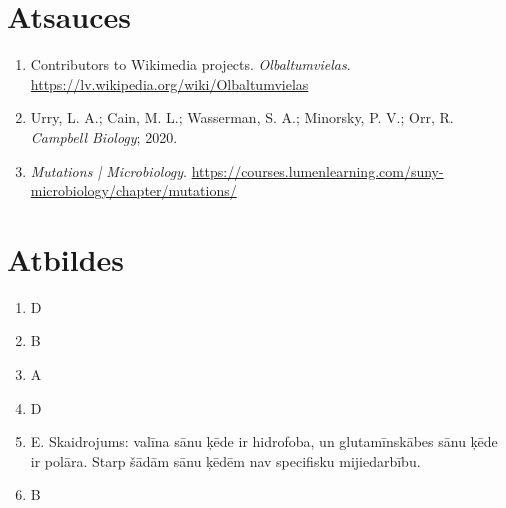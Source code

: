 \documentclass[12pt,a4paper]{article}
\begin{document}
\section*{Atsauces}
\begin{enumerate}[leftmargin=*]
    \item Contributors to Wikimedia projects. \textit{Olbaltumvielas}. \url{https://lv.wikipedia.org/wiki/Olbaltumvielas}
    \item Urry, L. A.; Cain, M. L.; Wasserman, S. A.; Minorsky, P. V.; Orr, R. \textit{Campbell Biology}; 2020.
    \item \textit{Mutations | Microbiology}. \url{https://courses.lumenlearning.com/suny-microbiology/chapter/mutations/}
\end{enumerate}


\newpage
\section*{Atbildes}

\begin{enumerate}
\item D
\item B
\item A
\item D
\item E. Skaidrojums: valīna sānu ķēde ir hidrofoba, un glutamīnskābes sānu ķēde ir polāra. Starp šādām sānu ķēdēm nav specifisku mijiedarbību.
\item B
\end{enumerate}
\end{document}
